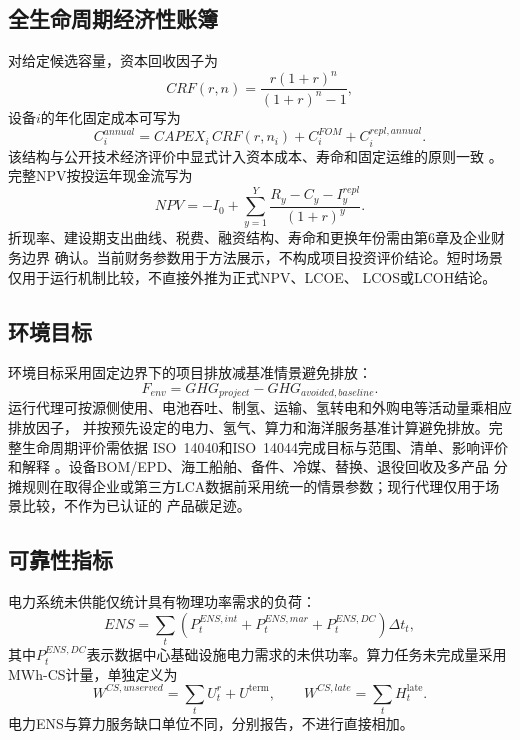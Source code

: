\subsection{全生命周期经济性账簿}

对给定候选容量，资本回收因子为
\begin{equation}
CRF(r,n)=\frac{r(1+r)^n}{(1+r)^n-1},
\label{eq:crf}
\end{equation}
设备$i$的年化固定成本可写为
\begin{equation}
C_i^{annual}=CAPEX_i\,CRF(r,n_i)+C_i^{FOM}+C_i^{repl,annual}.
\label{eq:annualized-cost}
\end{equation}
该结构与公开技术经济评价中显式计入资本成本、寿命和固定运维的原则一致
\cite{nrel-atb,iec60300}。完整NPV按投运年现金流写为
\begin{equation}
NPV=-I_0+\sum_{y=1}^{Y}
\frac{R_y-C_y-I_y^{repl}}{(1+r)^y}.
\label{eq:npv}
\end{equation}
折现率、建设期支出曲线、税费、融资结构、寿命和更换年份需由第6章及企业财务边界
确认。当前财务参数用于方法展示，不构成项目投资评价结论。短时场景仅用于运行机制比较，不直接外推为正式NPV、LCOE、
LCOS或LCOH结论。

\subsection{环境目标}

环境目标采用固定边界下的项目排放减基准情景避免排放：
\begin{equation}
F_{env}=GHG_{project}-GHG_{avoided,baseline}.
\label{eq:environment-objective}
\end{equation}
运行代理可按源侧使用、电池吞吐、制氢、运输、氢转电和外购电等活动量乘相应排放因子，
并按预先设定的电力、氢气、算力和海洋服务基准计算避免排放。完整生命周期评价需依据
ISO~14040和ISO~14044完成目标与范围、清单、影响评价和解释
\cite{iso14040,iso14044}。设备BOM/EPD、海工船舶、备件、冷媒、替换、退役回收及多产品
分摊规则在取得企业或第三方LCA数据前采用统一的情景参数；现行代理仅用于场景比较，不作为已认证的
产品碳足迹。

\subsection{可靠性指标}

电力系统未供能仅统计具有物理功率需求的负荷：
\begin{equation}
ENS=\sum_t\left(P_t^{ENS,int}+P_t^{ENS,mar}
+P_t^{ENS,DC}\right)\Delta t_t,
\label{eq:ens}
\end{equation}
其中$P_t^{ENS,DC}$表示数据中心基础设施电力需求的未供功率。算力任务未完成量采用
MWh-CS计量，单独定义为
\begin{equation}
W^{CS,unserved}=\sum_tU_t^r+U^{\mathrm{term}},
\qquad
W^{CS,late}=\sum_tH_t^{\mathrm{late}}.
\label{eq:compute-reliability}
\end{equation}
电力ENS与算力服务缺口单位不同，分别报告，不进行直接相加。

